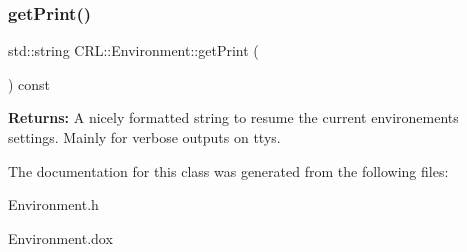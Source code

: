 \subsubsection{\texorpdfstring{get\+Print()}{getPrint()}}
{\footnotesize\ttfamily std\+::string C\+R\+L\+::\+Environment\+::get\+Print (\begin{DoxyParamCaption}{ }\end{DoxyParamCaption}) const}

{\bfseries Returns\+:} A nicely formatted string to resume the current environements settings. Mainly for verbose outputs on ttys. 

The documentation for this class was generated from the following files\+:\begin{DoxyCompactItemize}
\item 
Environment.\+h\item 
Environment.\+dox\end{DoxyCompactItemize}
